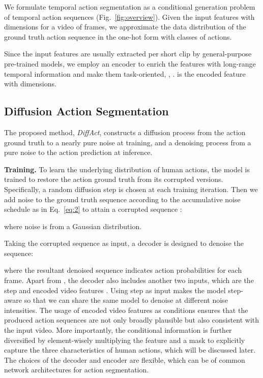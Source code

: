 \documentclass[10pt,twocolumn,letterpaper]{article}
\begin{document}
We formulate temporal action segmentation as a conditional generation problem of temporal action sequences (Fig.~\ref{fig:overview}).
Given the input features  with  dimensions for a video of  frames, we approximate the data distribution of the ground truth action sequence  in the one-hot form with  classes of actions.

Since the input features  are usually extracted per short clip by general-purpose pre-trained models, we employ an encoder  to enrich the features with long-range temporal information and make them task-oriented, \ie, .
 is the encoded feature with  dimensions.


\subsection{Diffusion Action Segmentation}

The proposed method, \textit{DiffAct}, constructs a diffusion process  from the action ground truth  to a nearly pure noise  at training, and a denoising process  from a pure noise  to the action prediction  at inference. 

\textbf{Training.}
To learn the underlying distribution of human actions, the model is trained to restore the action ground truth from its corrupted versions.
Specifically, a random diffusion step  is chosen at each training iteration.
Then we add noise to the ground truth sequence  according to the accumulative noise schedule as in Eq.~\ref{eq:2} to attain a corrupted sequence :

where noise  is from a Gaussian distribution.

Taking the corrupted sequence as input, a decoder  is designed to denoise the sequence:

where the resultant denoised sequence  indicates action probabilities for each frame. 
Apart from , the decoder also includes another two inputs, which are the step  and encoded video features .
Using step  as input makes the model step-aware so that we can share the same model to denoise at different noise intensities.
The usage of encoded video features  as conditions ensures that the produced action sequences are not only broadly plausible but also consistent with the input video.
More importantly, the conditional information is further diversified by element-wisely multiplying the feature  and a mask  to explicitly capture the three characteristics of human actions, which will be discussed later. 
The choices of the decoder  and encoder  are flexible, which can be of common network architectures for action segmentation.
\end{document}
